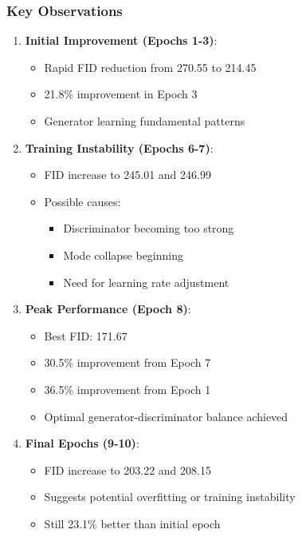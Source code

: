 \documentclass[conference,12pt]{IEEEtran}
\begin{document}
\subsubsection{Key Observations}

\begin{enumerate}
    \item \textbf{Initial Improvement (Epochs 1-3)}:
    \begin{itemize}
        \item Rapid FID reduction from 270.55 to 214.45
        \item 21.8\% improvement in Epoch 3
        \item Generator learning fundamental patterns
    \end{itemize}
    
    \item \textbf{Training Instability (Epochs 6-7)}:
    \begin{itemize}
        \item FID increase to 245.01 and 246.99
        \item Possible causes:
        \begin{itemize}
            \item Discriminator becoming too strong
            \item Mode collapse beginning
            \item Need for learning rate adjustment
        \end{itemize}
    \end{itemize}
    
    \item \textbf{Peak Performance (Epoch 8)}:
    \begin{itemize}
        \item Best FID: 171.67
        \item 30.5\% improvement from Epoch 7
        \item 36.5\% improvement from Epoch 1
        \item Optimal generator-discriminator balance achieved
    \end{itemize}
    
    \item \textbf{Final Epochs (9-10)}:
    \begin{itemize}
        \item FID increase to 203.22 and 208.15
        \item Suggests potential overfitting or training instability
        \item Still 23.1\% better than initial epoch
    \end{itemize}
\end{enumerate}
\end{document}
